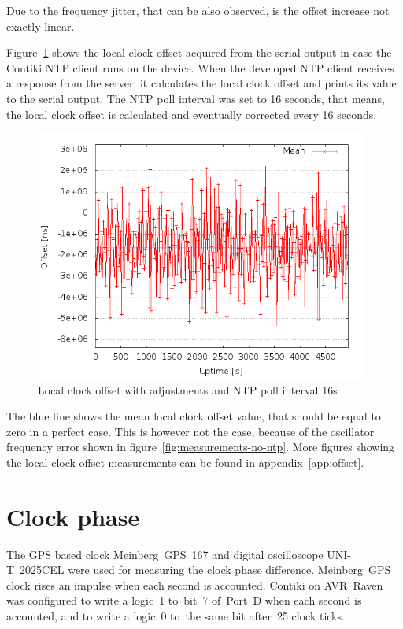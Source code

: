 Due to the frequency jitter, that can be also observed,
is the offset increase not exactly linear.

Figure~\ref{fig:measurements-ntp-serial} shows the local clock offset
acquired from the serial output in case the Contiki NTP client runs on the device.
When the developed NTP client receives a response from the server,
it calculates the local clock offset and prints its value to the serial output.
The NTP poll interval was set to 16 seconds, that means, the local clock offset
is calculated and eventually corrected every 16 seconds.
\begin{figure}[H]
  \centering
  \includegraphics[width=11cm,keepaspectratio]{fig/poll-16s.png}
  \caption{Local clock offset with adjustments and NTP poll interval 16s}
  \label{fig:measurements-ntp-serial}
\end{figure}
The blue line shows the mean local clock offset value,
that should be equal to zero in a perfect case.
This is however not the case, because of the oscillator frequency error
shown in figure~\ref{fig:measurements-no-ntp}.
More figures showing the local clock offset measurements
can be found in appendix~\ref{app:offset}.

\section{Clock phase}
The GPS based clock Meinberg~GPS~167 and digital oscilloscope UNI-T~2025CEL
were used for measuring the clock phase difference.
Meinberg~GPS clock rises an impulse when each second is accounted.
Contiki on AVR~Raven was configured to write a logic~1
to~bit~7 of~Port~D when each second is accounted,
and to write a logic~0 to~the same bit after~25 clock ticks.

